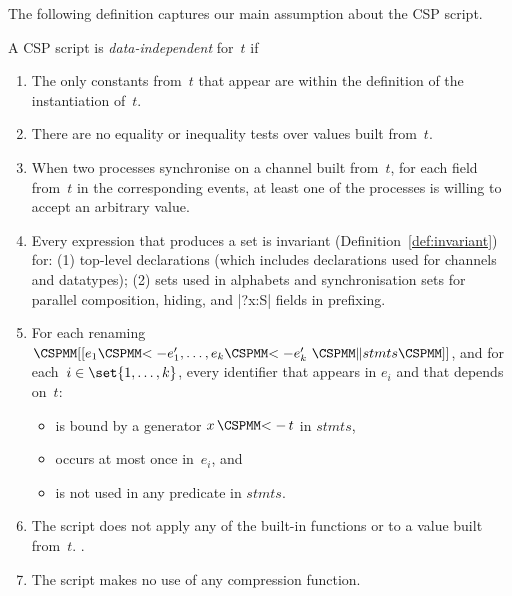 The following definition captures our main assumption about the CSP script.
%
\begin{definition}
\label{defn:data-independent}
A CSP script is \emph{data-independent} for~$t$ if
\begin{enumerate}
\item The only constants from~$t$ that appear are within the definition
  of the instantiation of~$t$.

\item There are no equality or inequality tests over values built from~$t$.

\item When two processes synchronise on a channel built from~$t$, for each
  field from~$t$ in the corresponding events, at least one of the processes is
  willing to accept an arbitrary value.

\item\label{item:di-invariant} Every expression that produces a set is
  invariant (Definition~\ref{def:invariant}) for: (1) top-level declarations
  (which includes declarations used for channels and datatypes); (2) sets used
  in alphabets and synchronisation sets for parallel composition, hiding, and
  |?x:S| fields in prefixing.

\item\label{item:di-renaming} For each renaming $\rename{e_1 \lArrow e_1',
  \ldots, e_k \lArrow e_k' ~ \M\| stmts}$, and for each~$i \in
  \set{1,\ldots,k}$, every identifier that appears in $e_i$ and that depends
  on~$t$:
%
\begin{itemize}
\item is bound by a generator $x \,\M{<-}\, t$ in $stmts$, 

\item occurs at most once in~$e_i$, and

\item is not used in any predicate in $stmts$.
\end{itemize}

\item The script does not apply any of the built-in functions
   or  to a value built from~$t$.
  \framebox{\ldots}. 

\item The script makes no use of any compression function.
\end{enumerate}
\end{definition}

